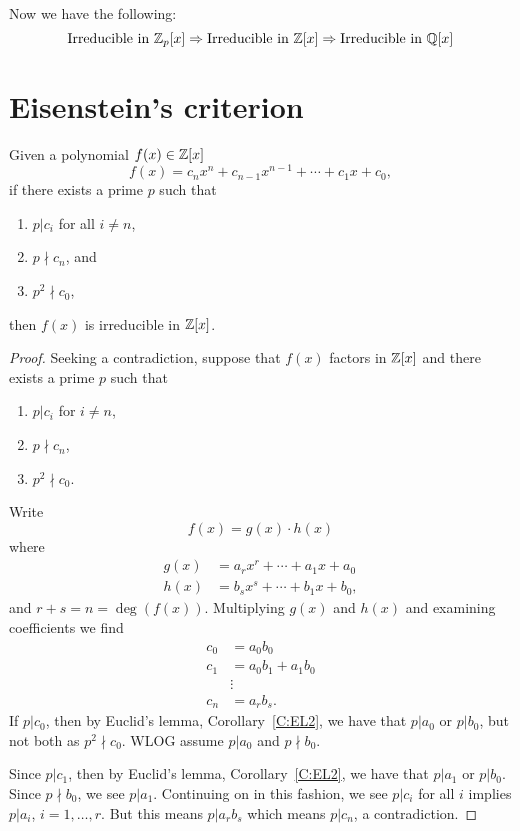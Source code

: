 \documentclass{ximera}
\begin{document}
Now we have the following:
\[
\text{Irreducible in $\mathbb Z_p[x]$} \Rightarrow \text{Irreducible in $\mathbb Z[x]$}  \Rightarrow \text{Irreducible in $\mathbb Q[x]$}
\]


\section{Eisenstein's criterion}



\begin{theorem}\label{T:ec}
  Given a polynomial $f(x) \in\mathbb Z[x]$
  \[
  f(x) = c_nx^n + c_{n-1}x^{n-1} + \cdots + c_1 x + c_0,
  \]
  if there exists a prime $p$ such that
  \begin{enumerate}
  \item $p|c_i$ for all $i \ne n$,
  \item $p\nmid c_n$, and
  \item $p^2\nmid c_0$,
  \end{enumerate}
  then $f(x)$ is irreducible in $\mathbb Z[x]$.
  \begin{proof}
    Seeking a contradiction, suppose that $f(x)$ factors in $\mathbb Z[x]$ and there exists a prime $p$ such that
  \begin{enumerate}
  \item $p|c_i$ for $i \ne n$,
  \item $p\nmid c_n$,
  \item $p^2\nmid c_0$.
  \end{enumerate}
  Write
  \[
  f(x) = g(x) \cdot h(x)
  \]
  where
  \begin{align*}
    g(x) &= a_rx^r + \cdots + a_1 x+ a_0\\
    h(x) &= b_sx^s + \cdots + b_1 x+ b_0,
  \end{align*}
  and $r + s = n = \deg(f(x))$. Multiplying $g(x)$ and $h(x)$ and
  examining coefficients we find
  \begin{align*}
    c_0 &= a_0b_0\\
    c_1 &= a_0b_1 + a_1 b_0\\
    &\vdots \\
    c_n &= a_r b_s.
  \end{align*}
  If $p| c_0$, then by Euclid's lemma, Corollary~\ref{C:EL2}, we have
    that $p|a_0$ or $p|b_0$, but not both as $p^2\nmid c_0$. WLOG
    assume $p|a_0$ and $p\nmid b_0$.

    Since $p|c_1$, then by Euclid's lemma, Corollary~\ref{C:EL2}, we
    have that $p|a_1$ or $p|b_0$. Since $p\nmid b_0$, we see
    $p|a_1$. Continuing on in this fashion, we see $p|c_i$ for all $i$
    implies $p| a_i$, $i=1,\dots, r$. But this means $p|a_rb_s$ which
    means $p|c_n$, a contradiction.
  \end{proof}
\end{theorem}
\end{document}
